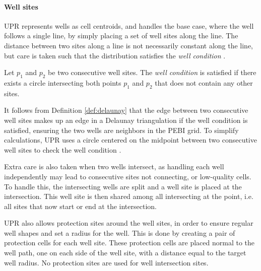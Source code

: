 \paragraph{Well sites}
\label{UPR:wells}
UPR represents wells as cell centroids, and handles the base case, where the well follows a single line, by simply placing a set of well sites along the line. The distance between two sites along a line is not necessarily constant along the line, but care is taken such that the distribution satisfies the \emph{well condition} \cite[pp.42]{UPR_thesis}.

\begin{definition}
Let $p_1$ and $p_2$ be two consecutive well sites. The \emph{well condition} is satisfied if there exists a circle intersecting both points $p_1$ and $p_2$ that does not contain any other sites.
\end{definition}

It follows from Definition \ref{def:delaunay} that the edge between two consecutive well sites makes up an edge in a Delaunay triangulation if the well condition is satisfied, ensuring the two wells are neighbors in the PEBI grid. To simplify calculations, UPR uses a circle centered on the midpoint between two consecutive well sites to check the well condition \cite{UPR_thesis}.

Extra care is also taken when two wells intersect, as handling each well independently may lead to consecutive sites not connecting, or low-quality cells. To handle this, the intersecting wells are split and a well site is placed at the intersection. This well site is then shared among all intersecting at the point, i.e. all sites that now start or end at the intersection. 

UPR also allows protection sites around the well sites, in order to ensure regular well shapes and set a radius for the well. This is done by creating a pair of protection cells for each well site. These protection cells are placed normal to the well path, one on each side of the well site, with a distance equal to the target well radius. No protection sites are used for well intersection sites.

